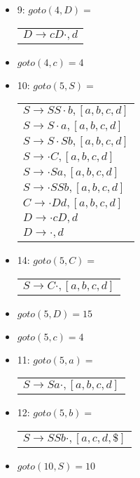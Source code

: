 \documentclass{article}
\begin{document}
\begin{itemize}
    \item 9: $goto(4, D) = $
    \begin{tabular}{l}
    $D \to cD \cdot, d $ \\
    \end{tabular}
    
    \item $goto(4, c) = 4$
    
    \item 10: $goto(5, S) = $
    \begin{tabular}{l}
    $S \to SS \cdot b, [a, b, c, d] $ \\
    $S \to S \cdot a, [a, b, c, d] $ \\
    $S \to S \cdot Sb, [a, b, c, d] $ \\
    $S \to \cdot C, [a, b, c, d] $ \\
    $S \to \cdot Sa, [a, b, c, d] $ \\
    $S \to \cdot SSb, [a, b, c, d] $ \\
    $C \to \cdot Dd, [a, b, c, d] $ \\
    $D \to \cdot cD, d $ \\
    $D \to \cdot , d $ \\
    \end{tabular} 
  
    \item 14: $goto(5, C) =$
    \begin{tabular}{l}
    $S \to C \cdot, [a, b, c, d] $ \\
    \end{tabular}
    
    \item $goto(5, D) = 15$
    
    \item $goto(5, c) = 4$
    
    \item 11: $goto(5, a) =$
    \begin{tabular}{l}
    $S \to Sa \cdot, [a, b, c, d] $ \\
    \end{tabular} 
    
    \item 12: $goto(5, b) =$
    \begin{tabular}{l}
    $S \to SSb \cdot, [a, c, d, \$] $ \\
    \end{tabular} 
    
    \item $goto(10, S) = 10$
    

\end{itemize}
\end{document}
